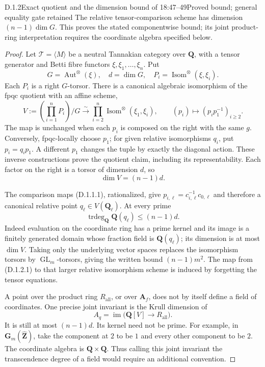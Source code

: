 \begin{result}{D.1.2}{Exact quotient and the dimension bound of 18:47--49}{Proved bound; general equality gate retained}
The relative tensor-comparison scheme has dimension $(n-1)\dim G$. This proves the stated componentwise bound; its joint product-ring interpretation requires the coordinate algebra specified below.
\end{result}
\begin{proof}
Let \(\mathcal T=\langle M\rangle\) be a neutral
Tannakian category over \(\mathbf Q\), with a tensor generator and
Betti fibre functors \(\xi,\xi_1,\ldots,\xi_n\). Put
\[
G=\operatorname{Aut}^{\otimes}(\xi),\quad d=\dim G,
\quad P_i=\operatorname{Isom}^{\otimes}(\xi,\xi_i).
\]
Each \(P_i\) is a right \(G\)-torsor. There is a canonical algebraic
isomorphism of the fpqc quotient with an affine scheme,
\[
V:=(\prod_{i=1}^nP_i)/G
\xrightarrow{\sim}
\prod_{i=2}^n\operatorname{Isom}^{\otimes}(\xi_1,\xi_i),
\qquad
(p_i)\longmapsto(p_i p_1^{-1})_{i\ge2}.
\tag{D.1.2.1}
\]
The map is unchanged when each \(p_i\) is composed on the right with
the same \(g\). Conversely, fpqc-locally choose \(p_1\); for given
relative isomorphisms \(q_i\), put \(p_i=q_i p_1\). A different
\(p_1\) changes the tuple by exactly the diagonal action. These
inverse constructions prove the quotient claim, including its
representability. Each factor on the right is a torsor of dimension
\(d\), so
\[
\dim V=(n-1)d.
\tag{D.1.2.2}
\]

The comparison maps (D.1.1.1), rationalized, give
\(p_{i,\ell}=c_{i,\ell}^{-1}c_{0,\ell}\) and therefore a canonical
relative point \(q_\ell\in V(\mathbf Q_\ell)\). At every prime
\[
\operatorname{trdeg}_{\mathbf Q}\mathbf Q(q_\ell)
\leq(n-1)d.
\tag{D.1.2.3}
\]
Indeed evaluation on the coordinate ring has a prime kernel and its
image is a finitely generated domain whose fraction field is
\(\mathbf Q(q_\ell)\); its dimension is at most \(\dim V\).
Taking only the underlying vector spaces replaces the isomorphism
torsors by \(\operatorname{GL}_m\)-torsors, giving the written bound
\((n-1)m^2\). The map from (D.1.2.1) to that larger relative
isomorphism scheme is induced by forgetting the tensor equations.

A point over the product ring \(R_{\mathrm{all}}\), or over
\(\mathbf A_f\), does not by itself define a field of coordinates.
One precise joint invariant is the Krull dimension of
\[
A_q=\operatorname{im}\bigl(\mathbf Q[V]\to R_{\mathrm{all}}\bigr).
\]
It is still at most \((n-1)d\). Its kernel need not be prime. For
example, in \(\mathbf G_m(\widehat{\mathbf Z})\), take the component
at \(2\) to be \(1\) and every other component to be \(2\). The
coordinate algebra is \(\mathbf Q\times\mathbf Q\). Thus calling
this joint invariant the transcendence degree of a field would require
an additional convention.


\end{proof}
